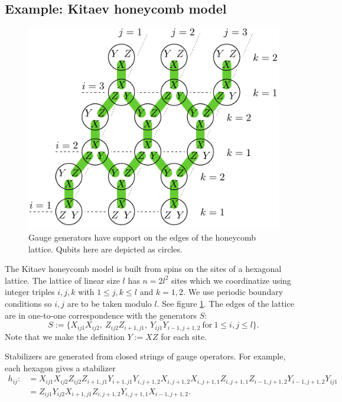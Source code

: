 \documentclass[12pt,notitlepage,longbibliography,nofootinbib,tightenlines]{revtex4}
\begin{document}
%
%

\subsection{Example: Kitaev honeycomb model}


\begin{figure}[th!]
\begin{center}
        \includegraphics[width=0.6\columnwidth]{fig_00.pdf}
\caption{
Gauge generators have support on the edges of the honeycomb lattice.
Qubits here are depicted as circles.
}
\label{honeycomb}
\end{center}
\end{figure}


The Kitaev honeycomb model \cite{Kitaev2006} is built from spins on
the sites of a hexagonal lattice. 
The lattice of linear size $l$ has $n=2l^2$ sites
which we coordinatize using integer triples $i, j, k$
with $1\le j, k\le l$ and $k=1, 2.$
We use periodic boundary conditions so $i, j$ are
to be taken modulo $l$.
See figure \ref{honeycomb}.
The edges of the lattice are in one-to-one
correspondence with the generators $S$:
$$
S := \big\{X_{ij1}X_{ij2},\ Z_{ij2}Z_{i+1,j1},\ Y_{ij1}Y_{i-1,j+1,2}
\ \mbox{for}\ 1\le i,j\le l\big\}.
$$
Note that we make the definition $Y:=XZ$ for each site.

Stabilizers are generated from closed strings of
gauge operators. 
For example, each hexagon gives a stabilizer
\begin{align*}
h_{ij}:&= 
X_{ij1}X_{ij2}
Z_{ij2}Z_{i+1,j1}
Y_{i+1,j1}Y_{i,j+1,2}
X_{i,j+1,2}X_{i,j+1,1}
Z_{i,j+1,1}Z_{i-1,j+1,2}
Y_{i-1,j+1,2}Y_{ij1}
\\
&= 
Z_{ij1} Y_{ij2} X_{i+1,j1}
Z_{i,j+1,2} Y_{i,j+1,1} X_{i-1,j+1,2}.
\end{align*}
\end{document}
